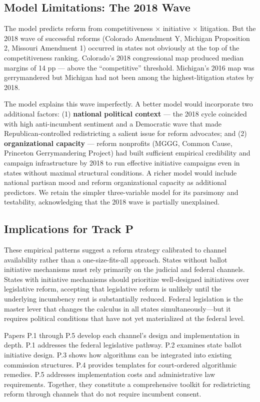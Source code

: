 \subsection{Model Limitations: The 2018 Wave}

The model predicts reform from competitiveness $\times$ initiative $\times$ litigation.
But the 2018 wave of successful reforms (Colorado Amendment Y, Michigan Proposition 2,
Missouri Amendment 1) occurred in states not obviously at the top of the
competitiveness ranking.
Colorado's 2018 congressional map produced median margins of 14 pp --- above the
``competitive'' threshold.
Michigan's 2016 map was gerrymandered but Michigan had not been among the highest-litigation
states by 2018.

The model explains this wave imperfectly.
A better model would incorporate two additional factors:
(1) \textbf{national political context} --- the 2018 cycle coincided with high anti-incumbent
sentiment and a Democratic wave that made Republican-controlled redistricting a salient issue
for reform advocates; and
(2) \textbf{organizational capacity} --- reform nonprofits (MGGG, Common Cause, Princeton
Gerrymandering Project) had built sufficient empirical credibility and campaign infrastructure
by 2018 to run effective initiative campaigns even in states without maximal structural
conditions.
A richer model would include national partisan mood and reform organizational capacity as
additional predictors.
We retain the simpler three-variable model for its parsimony and testability,
acknowledging that the 2018 wave is partially unexplained.

\subsection{Implications for Track P}

These empirical patterns suggest a reform strategy calibrated to channel availability rather than a one-size-fits-all approach. States without ballot initiative mechanisms must rely primarily on the judicial and federal channels. States with initiative mechanisms should prioritize well-designed initiatives over legislative reform, accepting that legislative reform is unlikely until the underlying incumbency rent is substantially reduced. Federal legislation is the master lever that changes the calculus in all states simultaneously---but it requires political conditions that have not yet materialized at the federal level.

Papers P.1 through P.5 develop each channel's design and implementation in depth. P.1 addresses the federal legislative pathway. P.2 examines state ballot initiative design. P.3 shows how algorithms can be integrated into existing commission structures. P.4 provides templates for court-ordered algorithmic remedies. P.5 addresses implementation costs and administrative law requirements. Together, they constitute a comprehensive toolkit for redistricting reform through channels that do not require incumbent consent.
